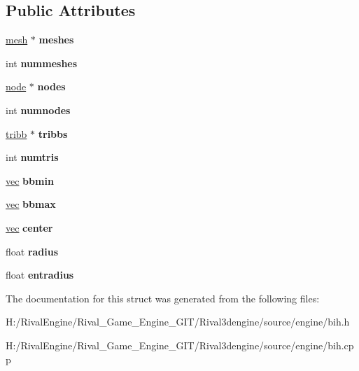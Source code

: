 \subsection*{Public Attributes}
\begin{DoxyCompactItemize}
\item 
\mbox{\label{struct_b_i_h_a596b4f2699831b227c7ef39a507f11f8}} 
\hyperlink{struct_b_i_h_1_1mesh}{mesh} $\ast$ {\bfseries meshes}
\item 
\mbox{\label{struct_b_i_h_a7ba639f2f3f4c580390b279a07b8593d}} 
int {\bfseries nummeshes}
\item 
\mbox{\label{struct_b_i_h_a95b4c328b2098e2070e85b120985b528}} 
\hyperlink{struct_b_i_h_1_1node}{node} $\ast$ {\bfseries nodes}
\item 
\mbox{\label{struct_b_i_h_ae10f080c7fd742588e31fc5d3426cbb4}} 
int {\bfseries numnodes}
\item 
\mbox{\label{struct_b_i_h_a0c6316bde35c73d4ed0eae5f304f92de}} 
\hyperlink{struct_b_i_h_1_1tribb}{tribb} $\ast$ {\bfseries tribbs}
\item 
\mbox{\label{struct_b_i_h_adde0b38c1a8ad466748b56a77b5c85d2}} 
int {\bfseries numtris}
\item 
\mbox{\label{struct_b_i_h_afa88ff782bc1d97d9856a2443c6d8c77}} 
\hyperlink{structvec}{vec} {\bfseries bbmin}
\item 
\mbox{\label{struct_b_i_h_aacd20a7c1cb09e747f1ee69c622f0985}} 
\hyperlink{structvec}{vec} {\bfseries bbmax}
\item 
\mbox{\label{struct_b_i_h_a22a3b36b8081d49228fc56a2e6db3ccc}} 
\hyperlink{structvec}{vec} {\bfseries center}
\item 
\mbox{\label{struct_b_i_h_ad7870a81de3301279043cc49268d46cd}} 
float {\bfseries radius}
\item 
\mbox{\label{struct_b_i_h_a533795f5b43acf8c567a2552447826f6}} 
float {\bfseries entradius}
\end{DoxyCompactItemize}


The documentation for this struct was generated from the following files\+:\begin{DoxyCompactItemize}
\item 
H\+:/\+Rival\+Engine/\+Rival\+\_\+\+Game\+\_\+\+Engine\+\_\+\+G\+I\+T/\+Rival3dengine/source/engine/bih.\+h\item 
H\+:/\+Rival\+Engine/\+Rival\+\_\+\+Game\+\_\+\+Engine\+\_\+\+G\+I\+T/\+Rival3dengine/source/engine/bih.\+cpp\end{DoxyCompactItemize}
